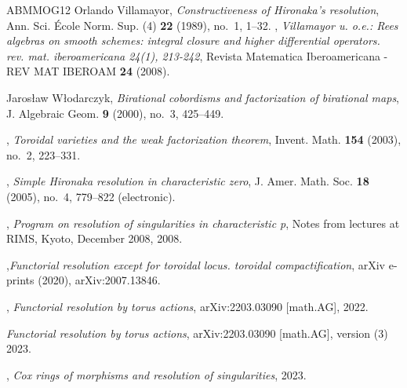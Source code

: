 \documentclass{amsart}
\begin{document}
\begin{thebibliography}{ABMMOG12}
Orlando Villamayor, \emph{Constructiveness of {H}ironaka's resolution}, Ann.
  Sci. \'Ecole Norm. Sup. (4) \textbf{22} (1989), no.~1, 1--32. 
\bysame, \emph{Villamayor u. o.e.: Rees algebras on smooth schemes:
  integral closure and higher differential operators. rev. mat. iberoamericana
  24(1), 213-242}, Revista Matematica Iberoamericana - REV MAT IBEROAM
  \textbf{24} (2008).

Jaros{\l}aw W{\l}odarczyk, \emph{Birational cobordisms and factorization of
  birational maps}, J. Algebraic Geom. \textbf{9} (2000), no.~3, 425--449.

\bysame, \emph{Toroidal varieties and the weak factorization theorem}, Invent.
  Math. \textbf{154} (2003), no.~2, 223--331. 

\bysame, \emph{Simple {H}ironaka resolution in characteristic zero}, J. Amer.
  Math. Soc. \textbf{18} (2005), no.~4, 779--822 (electronic). 

\bysame, \emph{Program on resolution of singularities in
  characteristic p}, Notes from lectures at RIMS, Kyoto, December 2008, 2008.

\bysame,\emph{Functorial resolution except for toroidal
  locus. toroidal compactification}, arXiv e-prints (2020), arXiv:2007.13846.

\bysame,
\newblock \emph{Functorial resolution by torus actions},
\newblock arXiv:2203.03090 [math.AG], 2022.

 \newblock \emph{Functorial resolution by torus actions},
\newblock arXiv:2203.03090 [math.AG], version (3) 2023.


\bysame, \emph{Cox rings of morphisms and resolution of singularities}, 2023.

\end{thebibliography}



%
\end{document}
